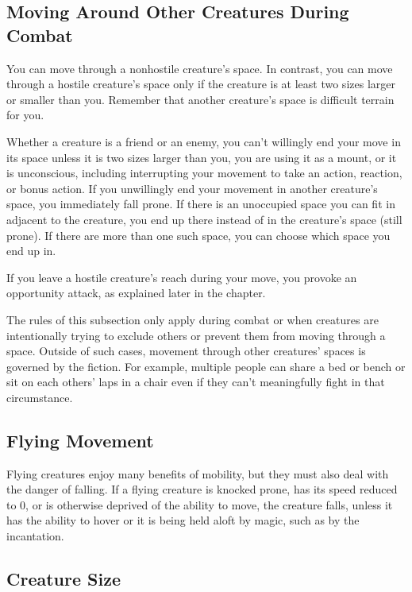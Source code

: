 \subsection{Moving Around Other Creatures During Combat}

You can move through a nonhostile creature's space. In contrast, you can move through a hostile creature's space only if the creature is at least two sizes larger or smaller than you. Remember that another creature's space is difficult terrain for you.

Whether a creature is a friend or an enemy, you can't willingly end your move in its space unless it is two sizes larger than you, you are using it as a mount, or it is unconscious, including interrupting your movement to take an action, reaction, or bonus action. If you unwillingly end your movement in another creature's space, you immediately fall prone. If there is an unoccupied space you can fit in adjacent to the creature, you end up there instead of in the creature's space (still prone). If there are more than one such space, you can choose which space you end up in.

If you leave a hostile creature's reach during your move, you provoke an opportunity attack, as explained later in the chapter.

The rules of this subsection only apply during combat or when creatures are intentionally trying to exclude others or prevent them from moving through a space. Outside of such cases, movement through other creatures' spaces is governed by the fiction. For example, multiple people can share a bed or bench or sit on each others' laps in a chair even if they can't meaningfully fight in that circumstance.

\subsection{Flying Movement}

Flying creatures enjoy many benefits of mobility, but they must also deal with the danger of falling. If a flying creature is knocked prone, has its speed reduced to 0, or is otherwise deprived of the ability to move, the creature falls, unless it has the ability to hover or it is being held aloft by magic, such as by the  incantation.

\subsection{Creature Size}

